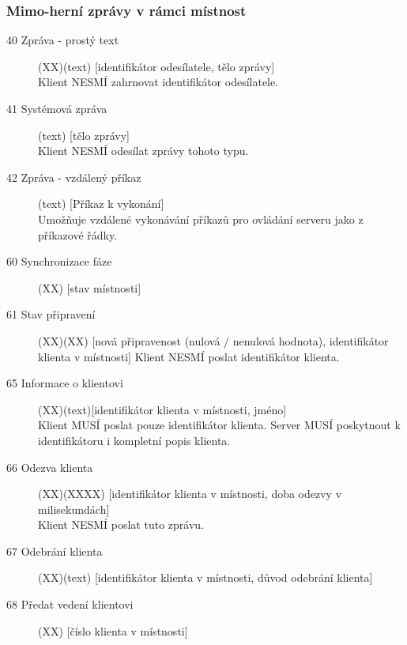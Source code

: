 \documentclass[12pt,a4paper]{article}
\begin{document}
\subsubsection*{Mimo-herní zprávy v rámci místnost}
\begin{description}
\item[40 Zpráva - prostý text](XX)(text) [identifikátor odesílatele, tělo zprávy] \\
Klient NESMÍ zahrnovat identifikátor odesílatele.
\item[41 Systémová zpráva](text) [tělo zprávy] \\
Klient NESMÍ odesílat zprávy tohoto typu.
\item[42 Zpráva - vzdálený příkaz](text) [Příkaz k vykonání] \\
Umožňuje vzdálené vykonávání příkazů pro ovládání serveru jako z příkazové řádky.

\item[60 Synchronizace fáze] (XX) [stav místnosti]

\item[61 Stav připravení] (XX)(XX) [nová připravenost (nulová / nenulová hodnota), identifikátor klienta v místnosti]
Klient NESMÍ poslat identifikátor klienta.

\item[65 Informace o klientovi] (XX)(text)[identifikátor klienta v místnosti, jméno] \\
Klient MUSÍ poslat pouze identifikátor klienta. Server MUSÍ poskytnout k identifikátoru i kompletní popis klienta.

\item[66 Odezva klienta] (XX)(XXXX) [identifikátor klienta v místnosti, doba odezvy v milisekundách] \\
Klient NESMÍ poslat tuto zprávu.

\item[67 Odebrání klienta] (XX)(text) [identifikátor klienta v místnosti, důvod odebrání klienta]

\item[68 Předat vedení klientovi] (XX) [číslo klienta v místnosti]
\end{description}
\end{document}
